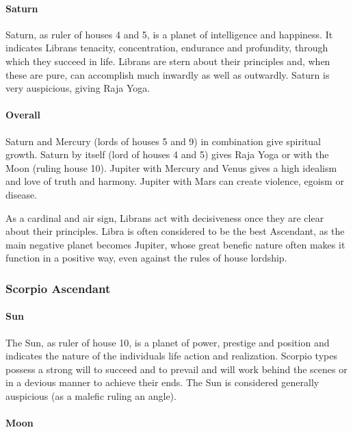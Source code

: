 \paragraph{Saturn}

Saturn, as ruler of houses 4 and 5, is a planet of intelligence and happiness. It indicates Librans tenacity, concentration, endurance and profundity, through which they succeed in life. Librans are stern about their principles and, when these are pure, can accomplish much inwardly as well as outwardly. Saturn is very auspicious, giving Raja Yoga.

 

\paragraph{Overall}

Saturn and Mercury (lords of houses 5 and 9) in combination give spiritual growth. Saturn by itself (lord of houses 4 and 5) gives Raja Yoga or with the Moon (ruling house 10). Jupiter with Mercury and Venus gives a high idealism and love of truth and harmony. Jupiter with Mars can create violence, egoism or disease.

 

As a cardinal and air sign, Librans act with decisiveness once they are clear about their principles. Libra is often considered to be the best Ascendant, as the main negative planet becomes Jupiter, whose great benefic nature often makes it function in a positive way, even against the rules of house lordship.

 

\subsubsection{Scorpio Ascendant}
 

\paragraph{Sun}

The Sun, as ruler of house 10, is a planet of power, prestige and position and indicates the nature of the individuals life action and realization. Scorpio types possess a strong will to succeed and to prevail and will work behind the scenes or in a devious manner to achieve their ends. The Sun is considered generally auspicious (as a malefic ruling an angle).

 

\paragraph{Moon}

